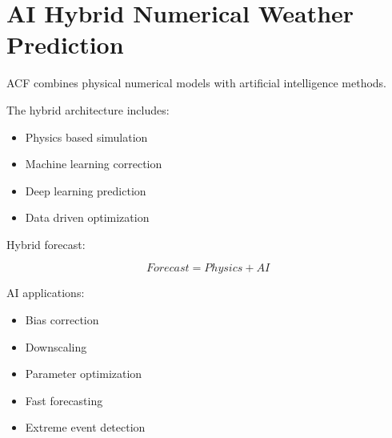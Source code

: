 \section{AI Hybrid Numerical Weather Prediction}


ACF combines physical numerical models with artificial
intelligence methods.



The hybrid architecture includes:


\begin{itemize}

\item Physics based simulation

\item Machine learning correction

\item Deep learning prediction

\item Data driven optimization

\end{itemize}



Hybrid forecast:


\[
Forecast
=
Physics
+
AI
\]



AI applications:


\begin{itemize}

\item Bias correction

\item Downscaling

\item Parameter optimization

\item Fast forecasting

\item Extreme event detection

\end{itemize}
